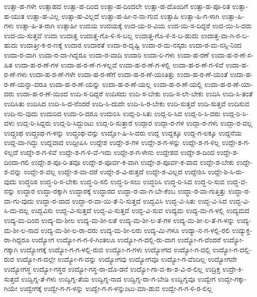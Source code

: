 {ಉತ್ಸಾ-ಹ-ಗಳೇ
ಉತ್ಸಾಹದ
ಉತ್ಸಾ-ಹ-ದಿಂದ
ಉತ್ಸಾ-ಹ-ದಿಂದಲೇ
ಉತ್ಸಾ-ಹ-ದೊಂದಿಗೆ
ಉತ್ಸಾ-ಹ-ಪೂ-ರಿತ
ಉತ್ಸಾ-ಹ-ಯುತ
ಉತ್ಸಾ-ಹ-ವಿಲ್ಲ
ಉತ್ಸಾ-ಹ-ವಿಲ್ಲದೆ
ಉತ್ಸಾ-ಹ-ಹೀ-ನ-ನಾ-ಗುವ
ಉತ್ಸಾಹಿ
ಉತ್ಸಾ-ಹಿ-ಗ-ಳಾಗಿ
ಉತ್ಸಾ-ಹಿ-ಗಳು
ಉತ್ಸಾ-ಹಿ-ತ-ರಾಗಿ
ಉತ್ಸಾಹೀ
ಉದಯ
ಉದಯಕ್ಕೆ
ಉದ-ಯ-ರ-ವಿಯ
ಉದ-ಯಿ-ಸ-ದಿದ್ದರೆ
ಉದ-ಯಿ-ಸಿ-ದರು
ಉದ-ಯಿ-ಸುತ್ತವೆ
ಉದಾ
ಉದಾತ್ತ
ಉದಾತ್ತ-ಗೊ-ಳಿ-ಸ-ಬಲ್ಲ
ಉದಾತ್ತ-ಗೊ-ಳಿ-ಸ-ಬ-ಹುದು
ಉದಾತ್ತ-ವಾ-ಗಿ-ರ-ಬ-ಹುದು
ಉದಾತ್ತೀ-ಕ-ರ-ಣಕ್ಕೆ
ಉದಾರ
ಉದಾರತೆ
ಉದಾ-ರ-ದೃಷ್ಟಿ
ಉದಾ-ರ-ಮ-ನಸ್ಕರು
ಉದಾ-ರ-ಮ-ನಸ್ಸಿ-ನಿಂದ
ಉದಾ-ರ-ವಾಗಿ
ಉದಾ-ರ-ವಾ-ಗಿದ್ದರೂ
ಉದಾ-ರ-ವಾದಿ
ಉದಾರಿ
ಉದಾ-ರಿ-ಗಳು
ಉದಾ-ಹ-ರಣೆ
ಉದಾ-ಹ-ರ-ಣೆ-ಸ-ಹಿತ
ಉದಾ-ಹ-ರ-ಣೆ-ಗಳ
ಉದಾ-ಹ-ರ-ಣೆ-ಗ-ಳಲ್ಲವೆ
ಉದಾ-ಹ-ರ-ಣೆ-ಗ-ಳಲ್ಲಿ
ಉದಾ-ಹ-ರ-ಣೆ-ಗ-ಳಿವೆ
ಉದಾ-ಹ-ರ-ಣೆ-ಗಳು
ಉದಾ-ಹ-ರ-ಣೆ-ಗಳೇ
ಉದಾ-ಹ-ರ-ಣೆಗೆ
ಉದಾ-ಹ-ರ-ಣೆ-ಯಂತಿತ್ತು
ಉದಾ-ಹ-ರ-ಣೆ-ಯಂತೆ
ಉದಾ-ಹ-ರ-ಣೆ-ಯನ್ನಾ-ದರೂ
ಉದಾ-ಹ-ರ-ಣೆ-ಯನ್ನು
ಉದಾ-ಹ-ರ-ಣೆ-ಯಲ್ಲ
ಉದಾ-ಹ-ರ-ಣೆ-ಯಲ್ಲಿ
ಉದಾ-ಹ-ರ-ಣೆ-ಯಾ-ದರು
ಉದಾ-ಹ-ರ-ಣೆ-ಯಿಂದ
ಉದಿ-ಸ-ದಿದ್ದರೆ
ಉದಿಸದು
ಉದಿ-ಸ-ಬೇಕು
ಉದಿ-ಸ-ಲೇ-ಬೇಕು
ಉದಿಸಿ
ಉದಿ-ಸಿ-ತಂತೆ
ಉದಿಸಿತು
ಉದಿಸಿದ
ಉದಿ-ಸಿ-ದ-ನೆಂದರೆ
ಉದಿ-ಸಿ-ದುದೇ
ಉದಿ-ಸಿ-ರ-ಬೇಕು
ಉದಿ-ಸುತ್ತದೆ
ಉದಿ-ಸುತ್ತವೆ
ಉದಿಸುವ
ಉದಿ-ಸು-ವುದು
ಉದುರಿದ
ಉದು-ರಿ-ದರೂ
ಉದುರಿಸಿ
ಉದ್ಗ-ರಿ-ಸಿತು
ಉದ್ಗ-ರಿ-ಸಿದ
ಉದ್ಗ-ರಿ-ಸಿ-ದರು
ಉದ್ಗ-ರಿ-ಸಿ-ದಳು
ಉದ್ಗ-ರಿ-ಸಿದ್ದರು
ಉದ್ಗ-ರಿ-ಸಿದ್ದುಂಟು
ಉದ್ಗ-ರಿ-ಸುತ್ತಾರೆ
ಉದ್ಗಾರ
ಉದ್ಗಾ-ರ-ಗಳ
ಉದ್ಗಾ-ರ-ಗಳು
ಉದ್ಗಾ-ರ-ವಲ್ಲ
ಉದ್ಗ್ರಂಥ
ಉದ್ಗ್ರಂಥ-ಗ-ಳನ್ನು
ಉದ್ಗ್ರಂಥ-ವನ್ನು
ಉದ್ಘೋ-ಷಿ-ಸಿ-ದರು
ಉದ್ದ
ಉದ್ದಕ್ಕೂ
ಉದ್ದ-ಗ-ಲಕ್ಕೂ
ಉದ್ದನೆಯ
ಉದ್ದ-ವಾ-ಗಿದ್ದು
ಉದ್ದವಾದ
ಉದ್ದೀಪಿಸಿ
ಉದ್ದೇಶ
ಉದ್ದೇ-ಶ-ಗಳ
ಉದ್ದೇ-ಶ-ಗ-ಳನ್ನು
ಉದ್ದೇ-ಶ-ಗ-ಳಿಲ್ಲ
ಉದ್ದೇ-ಶ-ಗ-ಳಿಲ್ಲದೆ
ಉದ್ದೇ-ಶ-ಗ-ಳಿವೆ
ಉದ್ದೇ-ಶ-ಗ-ಳಿ-ವೆ-ಇದು
ಉದ್ದೇ-ಶ-ಗ-ಳೇನು
ಉದ್ದೇಶದ
ಉದ್ದೇ-ಶ-ದಿಂದ
ಉದ್ದೇ-ಶ-ದಿಂದಾ-ಗಲಿ
ಉದ್ದೇ-ಶ-ಪೂ-ರಿ-ತವೂ
ಉದ್ದೇ-ಶ-ಪೂರ್ವ-ಕ-ವಾಗಿ
ಉದ್ದೇ-ಶ-ಪೂರ್ವ-ಕ-ವಾದ
ಉದ್ದೇ-ಶ-ಬೇಕು
ಉದ್ದೇ-ಶ-ವನ್ನು
ಉದ್ದೇ-ಶ-ವಲ್ಲ
ಉದ್ದೇ-ಶ-ವಾ-ದರೆ
ಉದ್ದೇ-ಶ-ವಿ-ರುತ್ತದೆ
ಉದ್ದೇ-ಶ-ವಿಲ್ಲದ
ಉದ್ದೇಶಿಸಿ
ಉದ್ದೇ-ಶಿ-ಸಿ-ರು-ವುದು
ಉದ್ಧರಿಸ
ಉದ್ಧ-ರಿ-ಸ-ಬೇಕು
ಉದ್ಧ-ರಿ-ಸಲಿ
ಉದ್ಧ-ರಿ-ಸಲು
ಉದ್ಧರಿಸಿ
ಉದ್ಧ-ರಿ-ಸಿದ
ಉದ್ಧ-ರಿ-ಸುವ
ಉದ್ಧ-ವ-ನನ್ನು
ಉದ್ಧಾರ
ಉದ್ಧಾ-ರಕ್ಕಾಗಿ
ಉದ್ಧಾರಕ್ಕೆ
ಉದ್ಧಾರದ
ಉದ್ಧಾ-ರ-ವಾ-ಗ-ಬೇ-ಕೆಂಬ
ಉದ್ಧಾ-ರ-ವಾ-ಗುತ್ತಿತ್ತು
ಉದ್ಧಾ-ರ-ವಾ-ಗು-ವುದು
ಉದ್ಧಾ-ರ-ವಾದ
ಉದ್ಧಾ-ರ-ವಾ-ಯಿ-ತೆ-ನಿ-ಸುತ್ತದೆ
ಉದ್ಭವಿಸಿ
ಉದ್ಭ-ವಿ-ಸಿತು
ಉದ್ಭ-ವಿ-ಸಿದ
ಉದ್ಭ-ವಿ-ಸಿ-ದು-ದಲ್ಲ
ಉದ್ಭವಿಸು
ಉದ್ಭ-ವಿ-ಸುತ್ತದೆ
ಉದ್ಭ-ವಿ-ಸುತ್ತವೆ
ಉದ್ಭ-ವಿ-ಸುವ
ಉದ್ಯಮ
ಉದ್ಯ-ಮ-ಗ-ಳಲ್ಲಿ
ಉದ್ಯಮದ
ಉದ್ಯ-ಮ-ದಿಂದ
ಉದ್ಯ-ಮ-ಶೀಲ
ಉದ್ಯ-ಮ-ಶೀ-ಲತೆ
ಉದ್ಯ-ಮ-ಶೀ-ಲ-ತೆ-ಗಳ
ಉದ್ಯ-ಮ-ಶೀ-ಲ-ತೆ-ಗ-ಳನ್ನು
ಉದ್ಯ-ಮ-ಶೀ-ಲ-ನಾದ
ಉದ್ಯ-ಮ-ಶೀ-ಲ-ರಾ-ದರು
ಉದ್ಯ-ಮ-ಶೀ-ಲರು
ಉದ್ಯ-ಮಿ-ಗಳೂ
ಉದ್ಯಾ-ನ-ಗ-ಳಲ್ಲಿ-ರಲಿ
ಉದ್ಯುಕ್ತ-ರಾ-ಗಿದ್ದರೂ
ಉದ್ಯೋಗ
ಉದ್ಯೋ-ಗ-ಗ-ಳಿ-ಗಿಂತಲೂ
ಉದ್ಯೋ-ಗ-ದಲ್ಲಿ-ರು-ವಾಗ
ಉದ್ಯೋ-ಗ-ವೆಂದರೆ
ಉದ್ಯೋ-ಗಕ್ಕಾಗಿ
ಉದ್ಯೋಗಕ್ಕೆ
ಉದ್ಯೋ-ಗ-ಗ-ಳಲ್ಲಿ-ರುವ
ಉದ್ಯೋ-ಗ-ಗಳು
ಉದ್ಯೋಗದ
ಉದ್ಯೋ-ಗ-ದಲ್ಲಿ
ಉದ್ಯೋ-ಗ-ದಲ್ಲಿ-ರುವ
ಉದ್ಯೋ-ಗ-ದಲ್ಲೇ
ಉದ್ಯೋ-ಗ-ವನ್ನು
ಉದ್ಯೋಗವು
ಉದ್ಯೋಗವೂ
ಉದ್ಯೋ-ಗ-ವೆಂದಿಲ್ಲ
ಉದ್ಯೋಗವೇ
ಉದ್ಯೋಗಸ್ಥ
ಉದ್ಯೋ-ಗಸ್ಥರ
ಉದ್ಯೋ-ಗಸ್ಥ-ರಾ-ದೊ-ಡನೆ
ಉದ್ಯೋ-ಗಾ-ವ-ಕಾ-ಶ-ವಿ-ರ-ಲಿಲ್ಲ
ಉದ್ರಿಕ್ತ
ಉದ್ರೇ-ಕಿ-ಸುತ್ತದೆ
ಉದ್ವಿಗ್ನ-ತೆ-ಗಳು
ಉದ್ವಿಗ್ನ-ತೆಯ
ಉದ್ವಿಗ್ನ-ನಾದ
ಉದ್ವಿಗ್ನ-ರಾ-ಗ-ಬೇಡಿ
ಉದ್ವಿಗ್ನವೂ
ಉದ್ವೇಗ
ಉದ್ವೇ-ಗಕ್ಕಾ-ಗಿಯೇ
ಉದ್ವೇಗಕ್ಕೆ
ಉದ್ವೇ-ಗ-ಗ-ಳನ್ನು
ಉದ್ವೇ-ಗ-ಗ-ಳನ್ನುಂಟು-ಮಾ-ಡುವ
ಉದ್ವೇ-ಗ-ಗ-ಳಿ-ರ-ಲಿಲ್ಲ
}
